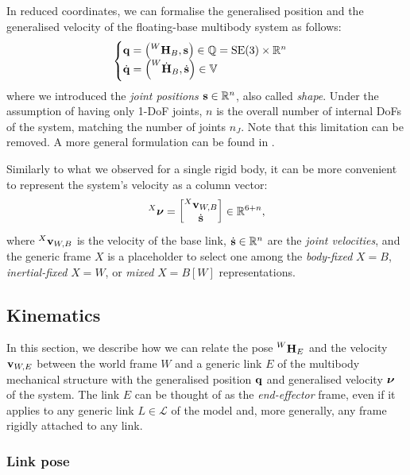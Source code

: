 In reduced coordinates, we can formalise the generalised position and the generalised velocity of the floating-base multibody system as follows:
%
\begin{equation*}
    \begin{cases}
        \Qu = \left(\homo[W]_B, \Shape\right) \in \mathbb{Q} = \SE(3) \times \realn^n \\
        \Qud = \left(\homod[W]_B, \Shaped\right) \in \mathbb{V}
    \end{cases}
\end{equation*}
%
where we introduced the \emph{joint positions} $\Shape \in \realn^n$, also called \emph{shape}.
Under the assumption of having only 1-\ac{DoF} joints, $n$ is the overall number of internal \aclp{DoF} of the system, matching the number of joints $n_J$.
Note that this limitation can be removed.
A more general formulation can be found in \parencite{featherstone_rigid_2008}.

Similarly to what we observed for a single rigid body, it can be more convenient to represent the system's velocity as a column vector:
%
\begin{equation*}
    \Nu[X] =
    \begin{bmatrix}
        \velsix[X]_{W,B} \\ \Shaped
    \end{bmatrix}
    \in \realn^{6+n}
    ,
\end{equation*}
%
where $\velsix[X]_{W,B}$ is the velocity of the base link, $\Shaped \in \realn^n$ are the \emph{joint velocities}, and the generic frame $X$ is a placeholder to select one among the \emph{body-fixed} $X=B$, \emph{inertial-fixed} $X=W$, or \emph{mixed} $X=B[W]$ representations.

\subsection{Kinematics}

In this section, we describe how we can relate the pose $\homo[W]_E$ and the velocity $\velsix_{W,E}$ between the world frame $W$ and a generic link $E$ of the multibody mechanical structure with the generalised position $\Qu$ and generalised velocity $\Nu$ of the system.
The link $E$ can be thought of as the \emph{end-effector} frame, even if it applies to any generic link $L \in \mathcal{L}$ of the model and, more generally, any frame rigidly attached to any link.

\subsubsection{Link pose}

